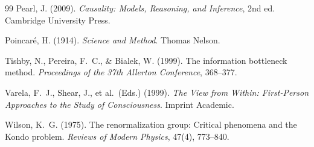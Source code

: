 \documentclass[11pt,a4paper]{article}
\begin{document}
\begin{thebibliography}{99}
Pearl, J. (2009).
\textit{Causality: Models, Reasoning, and Inference}, 2nd ed.
Cambridge University Press.

Poincar\'e, H. (1914).
\textit{Science and Method}.
Thomas Nelson.

Tishby, N., Pereira, F.~C., \& Bialek, W. (1999).
The information bottleneck method.
\textit{Proceedings of the 37th Allerton Conference}, 368--377.

Varela, F.~J., Shear, J., et al.\ (Eds.) (1999).
\textit{The View from Within: First-Person Approaches to the Study
of Consciousness}.
Imprint Academic.

Wilson, K.~G. (1975).
The renormalization group: Critical phenomena and the Kondo problem.
\textit{Reviews of Modern Physics}, 47(4), 773--840.

\end{thebibliography}
\end{document}
